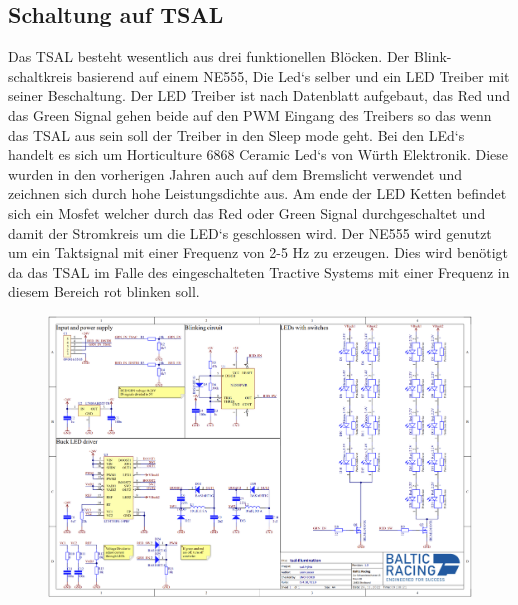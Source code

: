 \FloatBarrier
\subsection{Schaltung auf TSAL}

Das TSAL besteht wesentlich aus drei funktionellen Blöcken. Der Blink-schaltkreis basierend auf einem NE555, Die Led`s selber und ein LED Treiber mit seiner Beschaltung. Der LED Treiber ist nach Datenblatt aufgebaut, das Red und das Green Signal gehen beide auf den PWM Eingang des Treibers so das wenn das TSAL aus sein soll der Treiber in den Sleep mode geht. Bei den LEd`s handelt es sich um Horticulture 6868 Ceramic Led`s von Würth Elektronik. Diese wurden in den vorherigen Jahren auch auf dem Bremslicht verwendet und zeichnen sich durch hohe Leistungsdichte aus. Am ende der LED Ketten befindet sich ein Mosfet welcher durch das Red oder Green Signal durchgeschaltet und damit der Stromkreis um die LED`s geschlossen wird. Der NE555 wird genutzt um ein Taktsignal mit einer Frequenz von 2-5 Hz zu erzeugen. Dies wird benötigt da das TSAL im Falle des eingeschalteten Tractive Systems mit einer Frequenz in diesem Bereich rot blinken soll.

\begin{figure}
	\centering
	\includegraphics[width=0.7\linewidth]{"bilder/Tsal Schematic"}
	\caption{}
	\label{fig:tsal-schematic}
\end{figure}

\FloatBarrier